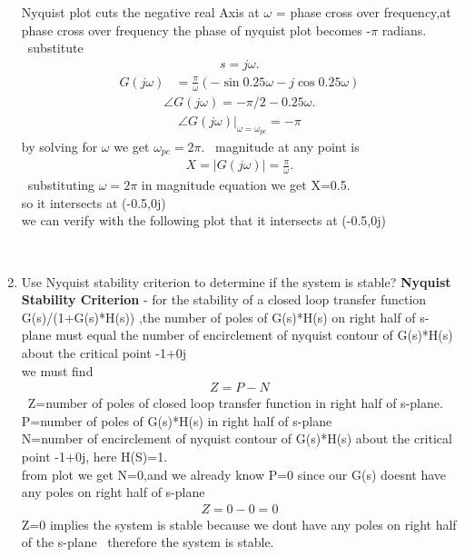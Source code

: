 \begin{enumerate}[label=\thesection.\arabic*.,ref=\thesection.\theenumi]
 Nyquist plot cuts the negative real
Axis at $\omega$ = phase cross over frequency,at phase cross over frequency the phase of nyquist plot becomes -$\pi$ radians.
\
\newline substitute \begin{align}
s=j\omega.\end{align} 
\begin{align}
G(j\omega)&=\frac{\pi}{\omega}(-\sin{0.25\omega}-j\cos{0.25\omega})
\end{align}
\begin{align}
\angle G(j\omega)=-\pi/2 -0.25\omega.
\end{align}
\begin{align}
\angle G(j\omega)|_{\omega=\omega_{pc}}=-\pi
\end{align}
by solving for $\omega$ we get $\omega_{pc}=2\pi$.
\
\newline magnitude at any point is\begin{align}
X=|G(j\omega)|=\frac{\pi}{\omega}.    
\end{align} 
\
\newline substituting $\omega=2\pi$ in magnitude equation we get X=0.5.
\\
\newline so it intersects at (-0.5,0j)
\\
\newline we can verify with the following plot that it intersects at (-0.5,0j)

\\
\item Use Nyquist stability criterion to determine if the system is stable?
\newline
\solution
 \textbf{Nyquist Stability Criterion} - for  the stability of a closed loop transfer function G(s)/(1+G(s)*H(s)) ,the number of poles of G(s)*H(s) on right half of s-plane must equal the number of encirclement of nyquist contour of  G(s)*H(s) about the critical point -1+0j
\\
\newline we must find
\begin{align}
Z=P-N    
\end{align}
\
Z=number of poles of closed loop transfer function in right half of s-plane.
\\ 
\newline P=number of poles of G(s)*H(s) in right half of s-plane
\\ 
\newline N=number of encirclement of nyquist contour of G(s)*H(s) about the critical point -1+0j,
here H(S)=1.
\\ 
\newline from plot we get N=0,and we already know P=0 since our G(s) doesnt have any poles on right half of s-plane
\begin{align}
Z=0-0=0
\end{align}
Z=0 implies the system is stable because we dont have any poles on right half of the s-plane
\
\newline therefore the system is stable.



\end{enumerate}
